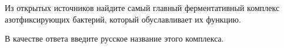 
Из открытых источников найдите самый главный ферментативный комплекс азотфиксирующих бактерий, который обуславливает их функцию.

В качестве ответа введите русское название этого комплекса.